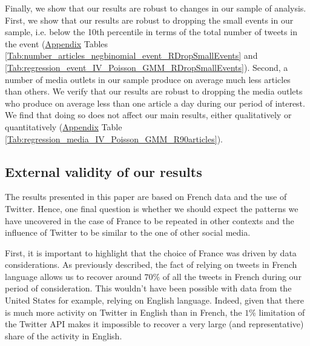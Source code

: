 Finally, we show that our results are robust to changes in our sample of analysis. First, we show that our results are robust to dropping the small events in our sample, i.e. below the 10th percentile in terms of the total number of tweets in the event (\hyperlink{ref:Appendix}{Appendix} Tables \ref{Tab:number_articles_negbinomial_event_RDropSmallEvents} and \ref{Tab:regression_event_IV_Poisson_GMM_RDropSmallEvents}). Second, a number of media outlets in our sample produce on average much less articles than others. We verify that our results are robust to dropping the media outlets who produce on average less than one article a day during our period of interest. We find that doing so does not affect our main results, either qualitatively or quantitatively (\hyperlink{ref:Appendix}{Appendix} Table \ref{Tab:regression_media_IV_Poisson_GMM_R90articles}).



\subsection{External validity of our results}

The results presented in this paper are based on French data and the use of Twitter. Hence, one final question is whether we should expect the patterns we have uncovered in the case of France to be repeated in other contexts and the influence of Twitter to be similar to the one of other social media.

First, it is important to highlight that the choice of France was driven by data considerations. As previously described, the fact of relying on tweets in French language allows us to recover around $70\%$ of all the tweets in French during our period of consideration. This wouldn't have been possible with data from the United States for example, relying on English language. Indeed, given that there is much more activity on Twitter in English than in French, the $1\%$ limitation of the Twitter API makes it impossible to recover a very large (and representative) share of the activity in English.

